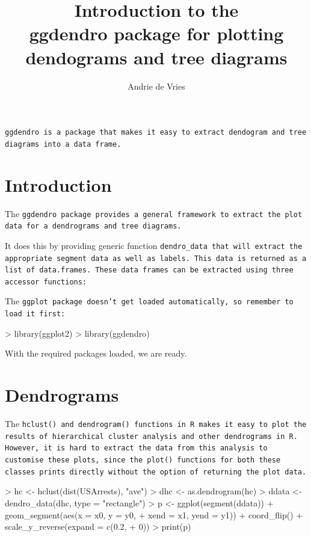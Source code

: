 \documentclass[a4paper]{article}
\title{Introduction to the \\ggdendro{} package for plotting dendograms and tree diagrams}
\author{Andrie de Vries}
\newcommand{\ggdendro}{\tt ggdendro}
\newcommand{\dendrodata}{\tt dendro\_data}
\newcommand{\code}[1]{\tt #1}
\begin{document}
\maketitle

\ggdendro{} is a package that makes it easy to extract dendogram and tree diagrams into a data frame.  

\section{Introduction}

The \ggdendro{} package provides a general framework to extract the plot data for a dendrograms and tree diagrams.

It does this by providing generic function \dendrodata{} that will extract the appropriate segment data as well as labels.  This data is returned as a list of data.frames.  These data frames can be extracted using three accessor functions:

\itemize{
\item{\code{segment}}
\item{\code{label}}
\item{\code{leaf\_label}}
}

The \code{ggplot} package doesn't get loaded automatically, so remember to load it first: 
  
\begin{Schunk}
\begin{Sinput}
> library(ggplot2)
> library(ggdendro)
\end{Sinput}
\end{Schunk}

With the required packages loaded, we are ready.


\section{Dendrograms}

The \code{hclust()} and \code{dendrogram()} functions in R makes it easy to plot the results of hierarchical cluster analysis and other dendrograms in R.  However, it is hard to extract the data from this analysis to customise these plots, since the \code{plot()} functions for both these classes prints directly without the option of returning the plot data.  

\begin{Schunk}
\begin{Sinput}
> hc <- hclust(dist(USArrests), "ave")
> dhc <- as.dendrogram(hc)
> ddata <- dendro_data(dhc, type = "rectangle")
> p <- ggplot(segment(ddata)) + geom_segment(aes(x = x0, y = y0, 
+     xend = x1, yend = y1)) + coord_flip() + scale_y_reverse(expand = c(0.2, 
+     0))
> print(p)
\end{Sinput}
\end{Schunk}
\end{document}
